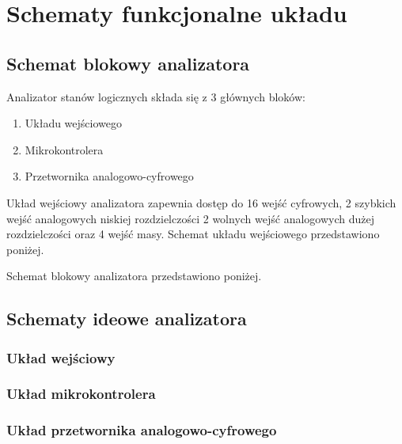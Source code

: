 \section{Schematy funkcjonalne układu}

\subsection{Schemat blokowy analizatora}
Analizator stanów logicznych składa się z 3 głównych bloków:
\begin{enumerate}
    \item Układu wejściowego
    \item Mikrokontrolera
    \item Przetwornika analogowo-cyfrowego 
\end{enumerate}
Układ wejściowy analizatora zapewnia dostęp do 16 wejść
cyfrowych, 2 szybkich wejść analogowych niskiej rozdzielczości
2 wolnych wejść analogowych dużej rozdzielczości oraz 4 wejść masy.
Schemat układu wejściowego przedstawiono poniżej.


Schemat blokowy analizatora przedstawiono poniżej.

\subsection{Schematy ideowe analizatora}
\subsubsection{Układ wejściowy}

\subsubsection{Układ mikrokontrolera}

\subsubsection{Układ przetwornika analogowo-cyfrowego}






